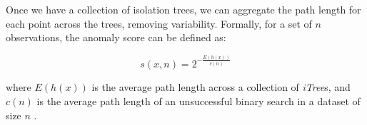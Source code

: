 \documentclass{beamer}
\begin{document}
\begin{frame}

    Once we have a collection of isolation trees, we can aggregate the path length
    for each point across the trees, removing variability.  Formally, for a set of
    $n$ observations, the anomaly score can be defined as:

    \begin{equation*}
        s(x,n) = 2^{- \frac{E(h(x))}{c(n)}}
    \end{equation*}

    where $E(h(x))$ is the average path length across a collection of
    \textit{iTree}s, and $c(n)$ is the average path length of an unsuccessful
    binary search in a dataset of size $n$ \cite{liu2009}.

\end{frame}

\begin{frame}
    \printbibliography
\end{frame}
\end{document}
